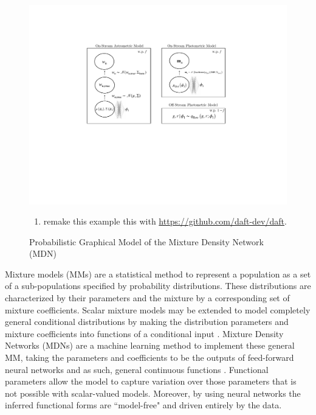 \documentclass[twocolumn]{aastex631}
\begin{document}
        \begin{figure}
            \centering
            \includegraphics[scale=0.5]{static/model/DAG_StreamDensity.pdf}
            \caption{Probabilistic Graphical Model of the Mixture Density Network (MDN)}
            \begin{enumerate}
                \item remake this example this with \url{https://github.com/daft-dev/daft}.
            \end{enumerate}
            \label{fig:DAG}
        \end{figure}

        Mixture models (MMs) are a statistical method to represent a population as a set of a sub-populations specified by probability distributions. These distributions are characterized by their parameters and the mixture by a corresponding set of mixture coefficients. Scalar mixture models may be extended to model completely general conditional distributions by making the distribution parameters and mixture coefficients into functions of a conditional input \citep{McLachlan1989MixtureM}.
        Mixture Density Networks (MDNs) are a machine learning method to implement these general MM, taking the parameters and coefficients to be the outputs of feed-forward neural networks and as such, general continuous functions \citep{Bishop1994}. Functional parameters allow the model to capture variation over those parameters that is not possible with scalar-valued models. Moreover, by using neural networks the inferred functional forms are ``model-free" and driven entirely by the data.
\end{document}
